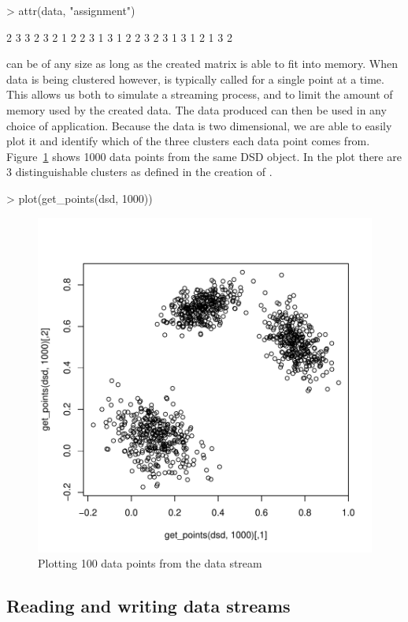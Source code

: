 \documentclass[nojss]{jss}
\begin{document}
\begin{Schunk}
\begin{Sinput}
> attr(data, "assignment")
\end{Sinput}
\begin{Soutput}
 [1] 2 3 3 2 3 2 1 2 2 3 1 3 1 2 2 3 2 3 1 3 1 2 1 3 2
\end{Soutput}
\end{Schunk}

 can be of any size as long as the created matrix is able to fit into memory. When data is being clustered however,  is typically called for a single point at a time. This allows us both to simulate a streaming process, and to limit the amount of memory used by the created data. The data produced can then be used in any choice of application. Because the data is two dimensional, we are able to easily plot it and identify which of the three clusters each data point comes from. Figure~\ref{figure:plot1} shows 1000 data points from the same DSD object. In the plot there are 3 distinguishable clusters as defined in the creation of .

\begin{Schunk}
\begin{Sinput}
> plot(get_points(dsd, 1000))
\end{Sinput}
\end{Schunk}

\begin{figure}
\centering
\includegraphics[width=.5\linewidth]{stream-plot1}
\caption{Plotting 100 data points from the data stream}
\label{figure:plot1}
\end{figure}

\subsection{Reading and writing data streams}
\label{examples:disk}
\end{document}
